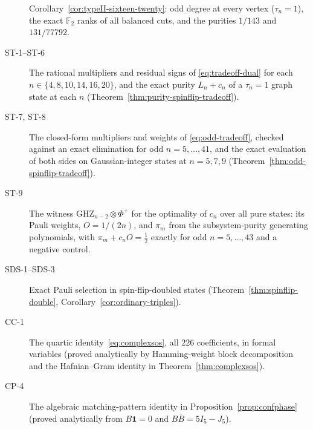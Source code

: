 \begin{description}
Corollary~\ref{cor:typeII-sixteen-twenty}: odd degree at every vertex ($\tau_n=1$), the exact $\mathbb F_2$ ranks of all balanced
cuts, and the purities $1/143$ and $131/77792$.
\item[ST-1--ST-6] The rational multipliers and residual signs of \eqref{eq:tradeoff-dual} for each
$n\in\{4,8,10,14,16,20\}$, and the exact purity $L_n+c_n$ of a $\tau_n=1$ graph state at each $n$
(Theorem~\ref{thm:purity-spinflip-tradeoff}).
\item[ST-7, ST-8] The closed-form multipliers and weights of \eqref{eq:odd-tradeoff}, checked against an exact elimination for odd $n=5,\dots,41$, and the
exact evaluation of both sides on Gaussian-integer states at $n=5,7,9$ (Theorem~\ref{thm:odd-spinflip-tradeoff}).
\item[ST-9] The witness $\mathrm{GHZ}_{n-2}\otimes\Phi^+$ for the optimality of $c_n$ over all pure states: its Pauli weights,
$O=1/(2n)$, and $\pi_m$ from the subsystem-purity generating polynomials, with $\pi_m+c_nO=\tfrac12$ exactly for odd
$n=5,\dots,43$ and a negative control.
\item[SDS-1--SDS-3] Exact Pauli selection in spin-flip-doubled states (Theorem~\ref{thm:spinflip-double},
Corollary~\ref{cor:ordinary-triples}).
\item[CC-1] The quartic identity~\eqref{eq:complexsos}, all $226$ coefficients, in formal variables
(proved analytically by Hamming-weight block decomposition and the Hafnian--Gram identity in Theorem~\ref{thm:complexsos}).
\item[CP-4] The algebraic matching-pattern identity in Proposition~\ref{prop:confphase} (proved analytically from $B\mathbf{1}=0$ and $B\overline B=5I_5-J_5$).
\end{description}
